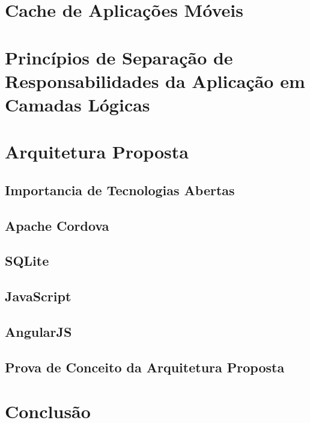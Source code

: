 \documentclass[
	article,			%
	11pt,				%
	oneside,			%
	a4paper,			%
	english,			%
	brazil,				%
	sumario=tradicional
]{abntex2}
\begin{document}
\section{Cache de Aplicações Móveis}

\section{Princípios de Separação de Responsabilidades da Aplicação em Camadas Lógicas}

\section{Arquitetura Proposta}

\subsection{Importancia de Tecnologias Abertas}

\subsection{Apache Cordova}

\subsection{SQLite}

\subsection{JavaScript}

\subsection{AngularJS}

\subsection{Prova de Conceito da Arquitetura Proposta}

\section{Conclusão} \label{introduction}
\end{document}
